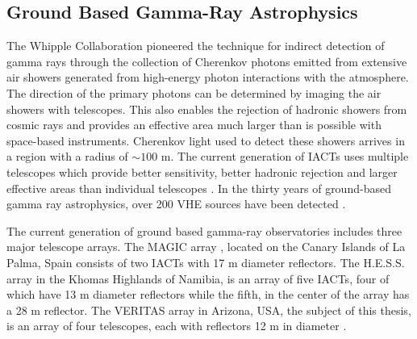 \documentclass[main.tex]{subfiles}
\begin{document}
\subsection{Ground Based Gamma-Ray Astrophysics}
The Whipple Collaboration \cite{Weekes:1989} pioneered the technique for indirect detection of gamma rays through the collection of Cherenkov photons emitted from extensive air showers generated from high-energy photon interactions with the atmosphere. The direction of the primary photons can be determined by imaging the air showers with telescopes. This also enables the rejection of hadronic showers from cosmic rays and provides an effective area much larger than is possible with space-based instruments. Cherenkov light used to detect these showers arrives in a region with a radius of $\sim 100$ m. The current generation of IACTs uses multiple telescopes which provide better sensitivity, better hadronic rejection and larger effective areas than individual telescopes \cite{Park:2017uxb}. In the thirty years of ground-based gamma ray astrophysics, over 200 VHE sources have been detected \cite{DiSciascio:2019ieq}.

The current generation of ground based gamma-ray observatories includes three major telescope arrays. The MAGIC array \cite{magic_web}, located on the Canary Islands of La Palma, Spain consists of two IACTs with 17 m diameter reflectors. The H.E.S.S. array \cite{hess_web} in the Khomas Highlands of Namibia, is an array of five IACTs, four of which have 13 m diameter reflectors while the fifth, in the center of the array has a 28 m reflector. The VERITAS array \cite{veritas_web} in Arizona, USA, the subject of this thesis, is an array of four telescopes, each with reflectors 12 m in diameter \cite{veritas_specs}.
\end{document}
